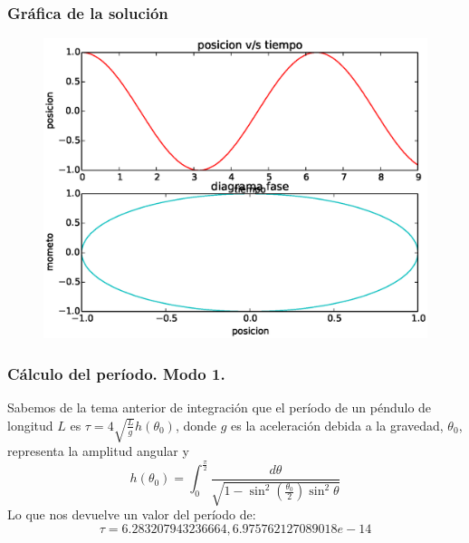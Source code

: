 \begin{frame}[fragile]
\frametitle{Gráfica de la solución}
\begin{figure}
	\centering
	\includegraphics[scale=0.5]{Examen3_P1.eps}  
\end{figure}
\end{frame}
\begin{frame}
\frametitle{Cálculo del período. Modo 1.}
Sabemos de la tema anterior de integración que el período de un péndulo de longitud $L$ es $\tau = 4 \sqrt{\frac{L}{g}} h(\theta_{0})$, donde $g$ es la aceleración debida a la gravedad, $\theta_{0}$, representa la amplitud angular y 
\[ h(\theta_{0}) =  \int_{0}^{\frac{\pi}{2}} \dfrac{d\theta}{\sqrt{1 - \sin^{2} \left( \frac{\theta_{0}}{2}\right) \sin^{2} \theta}} \]
Lo que nos devuelve un valor del período de:
\[\tau=6.283207943236664, 6.975762127089018e-14\]
\end{frame}

